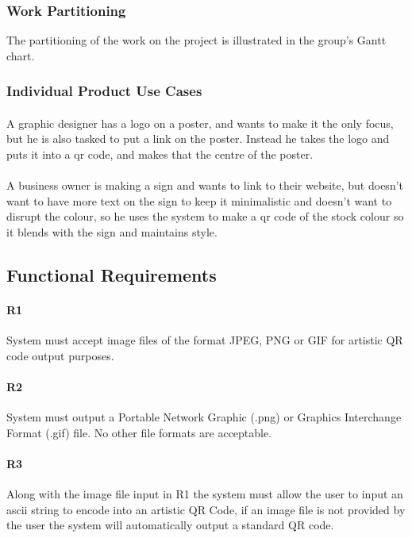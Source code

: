 \documentclass[12pt, titlepage]{article}
\begin{document}
\subsubsection{Work Partitioning}

	The partitioning of the work on the project is illustrated in the group's 
	Gantt chart.

\subsubsection{Individual Product Use Cases}

	\paragraph{}
	A graphic designer has a logo on a poster, and wants to make it the only 
	focus, but he is also tasked to put a link on the poster. Instead he takes 
	the logo and puts it into a qr code, and makes that the centre of the 
	poster.
	\paragraph{}
	 A business owner is making a sign and wants to link to their website, but 
	 doesn't want to have more text on the sign to keep it minimalistic and 
	 doesn't want to disrupt the colour, so he uses the system to make a qr 
	 code of the stock colour so it blends with the sign and maintains style.
	

\subsection{Functional Requirements}

	\paragraph{R1}
	System must accept image files of the format JPEG, PNG or GIF for artistic QR code output purposes.
	\paragraph{R2}
	System must output a Portable Network Graphic (.png) or Graphics Interchange Format (.gif) file. No other file 
	formats are acceptable. 
	\paragraph{R3}
	Along with the image file input in R1 the system must allow the user to input an ascii string to 
	encode into an artistic QR Code, if an image file is not provided by the user the system will automatically output a standard QR code.
\end{document}
